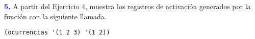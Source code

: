 \textbf{\textcolor{blue}{5.}} \Large
A partir del Ejercicio 4, muestra los registros de activación generados por la función con
la siguiente llamada.
\begin{lstlisting}
(ocurrencias '(1 2 3) '(1 2))
\end{lstlisting}
